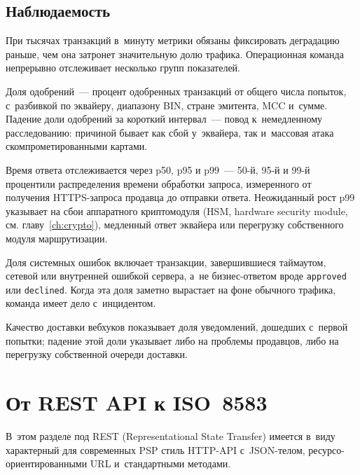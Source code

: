 \subsection*{Наблюдаемость}

При тысячах транзакций в~минуту метрики обязаны фиксировать деградацию
раньше, чем она затронет значительную долю трафика.
Операционная команда непрерывно отслеживает несколько групп показателей.

Доля одобрений~--- процент одобренных транзакций
от общего числа попыток, с~разбивкой по эквайеру, диапазону BIN,
стране эмитента, MCC и~сумме. Падение доли одобрений
за короткий интервал~--- повод к~немедленному расследованию:
причиной бывает как сбой у~эквайера, так и~массовая атака
скомпрометированными картами.

Время ответа отслеживается через p50, p95 и p99~--- 50-й, 95-й
и 99-й процентили распределения времени обработки запроса,
измеренного от получения HTTPS-запроса продавца до отправки
ответа. Неожиданный рост p99 указывает
на сбои аппаратного криптомодуля (HSM, hardware security module,
см. главу~\ref{ch:crypto}), медленный ответ эквайера или перегрузку
собственного модуля маршрутизации.

Доля системных ошибок включает транзакции,
завершившиеся таймаутом, сетевой или внутренней ошибкой сервера,
а~не бизнес-ответом вроде \texttt{approved} или \texttt{declined}. Когда эта
доля заметно вырастает на фоне обычного трафика, команда
имеет дело с~инцидентом.

Качество доставки вебхуков показывает доля уведомлений,
дошедших с~первой попытки; падение этой доли указывает либо на проблемы
продавцов, либо на перегрузку собственной очереди
доставки.

\section{От REST API к ISO~8583}\label{sec:gw-api-to-iso}

\noindent В~этом разделе под REST (Representational State Transfer)
имеется в~виду характерный для современных PSP стиль HTTP-API
с~JSON-телом, ресурсо-ориентированными URL и~стандартными методами.

